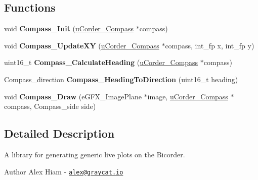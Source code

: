 \subsection*{Functions}
\begin{DoxyCompactItemize}
\item 
void {\bfseries Compass\+\_\+\+Init} (\hyperlink{structuCorder__Compass}{u\+Corder\+\_\+\+Compass} $\ast$compass)\hypertarget{bicorder-compass_8h_a25d1189ee5127c18accd79eb68019cde}{}\label{bicorder-compass_8h_a25d1189ee5127c18accd79eb68019cde}

\item 
void {\bfseries Compass\+\_\+\+Update\+XY} (\hyperlink{structuCorder__Compass}{u\+Corder\+\_\+\+Compass} $\ast$compass, int\+\_\+fp x, int\+\_\+fp y)\hypertarget{bicorder-compass_8h_a3e79bc358c252d3044f23b7e0766b54f}{}\label{bicorder-compass_8h_a3e79bc358c252d3044f23b7e0766b54f}

\item 
uint16\+\_\+t {\bfseries Compass\+\_\+\+Calculate\+Heading} (\hyperlink{structuCorder__Compass}{u\+Corder\+\_\+\+Compass} $\ast$compass)\hypertarget{bicorder-compass_8h_a0fd608a7bf9aea8112efb03a4bc9bc5f}{}\label{bicorder-compass_8h_a0fd608a7bf9aea8112efb03a4bc9bc5f}

\item 
Compass\+\_\+direction {\bfseries Compass\+\_\+\+Heading\+To\+Direction} (uint16\+\_\+t heading)\hypertarget{bicorder-compass_8h_a1051f457631ee90b4f082177cf19d469}{}\label{bicorder-compass_8h_a1051f457631ee90b4f082177cf19d469}

\item 
void {\bfseries Compass\+\_\+\+Draw} (e\+G\+F\+X\+\_\+\+Image\+Plane $\ast$image, \hyperlink{structuCorder__Compass}{u\+Corder\+\_\+\+Compass} $\ast$compass, Compass\+\_\+side side)\hypertarget{bicorder-compass_8h_a0ae721c1c17301cdf28bd0668a4f90af}{}\label{bicorder-compass_8h_a0ae721c1c17301cdf28bd0668a4f90af}

\end{DoxyCompactItemize}


\subsection{Detailed Description}
A library for generating generic live plots on the Bicorder. 

\begin{DoxyAuthor}{Author}
Alex Hiam -\/ \href{mailto:alex@graycat.io}{\tt alex@graycat.\+io} 
\end{DoxyAuthor}
